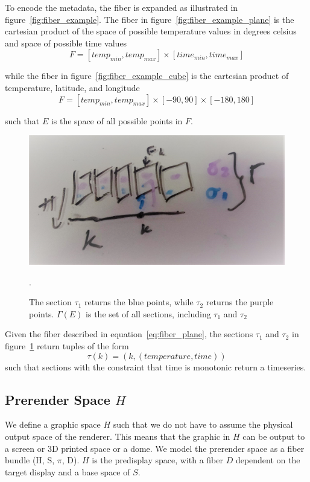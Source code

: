 \documentclass[../main.tex]{subfiles}
\begin{document}
To encode the metadata, the fiber is expanded as illustrated in figure~\ref{fig:fiber_example}. The fiber in figure~\ref{fig:fiber_example_plane} is the cartesian product of the space of possible temperature values in degrees celsius and space of possible time values
\begin{equation}
F = [temp_{min}, temp_{max}] \times [time_{min}, time_{max}]
\label{eq:fiber_plane}
\end{equation}

while the fiber in figure~\ref{fig:fiber_example_cube} is the cartesian product of temperature, latitude, and longitude
\begin{equation}
F = [temp_{min}, temp_{max}] \times [-90, 90] \times [-180, 180]
\label{eg:fiber_cube}
\end{equation}

such that $E$ is the space of all possible points in $F$.

\begin{figure}[h!]
    \includegraphics[width=1\linewidth]{figures/math/fiberbundle.png}
    \label{fig:fiber_example_section}
    \caption{The section $\tau_1$ returns the blue points,  while $\tau_2$ returns the purple points. $\Gamma(E)$ is the set of all sections, including $\tau_1$ and $\tau_2$}.  
\end{figure}
Given the fiber described in equation~\ref{eq:fiber_plane}, the sections $\tau_{1}$ and $\tau_{2}$ in figure~\ref{fig:fiber_example_section} return tuples of the form
\begin{equation}
\tau(k) = (k, (temperature, time))
\end{equation}
such that sections with the constraint that time is monotonic return a timeseries. 


\subsection{Prerender Space $H$}
\label{sec:display}
We define a graphic space $H$ such that we do not have to assume the physical output space of the renderer. This means that the graphic in $H$ can be output to a screen or 3D printed space or a dome. We model the prerender space as a fiber bundle (H, S, $\pi$, D). $H$ is the predisplay space, with a fiber $D$ dependent on the target display and a base space of $S$. 
\end{document}
